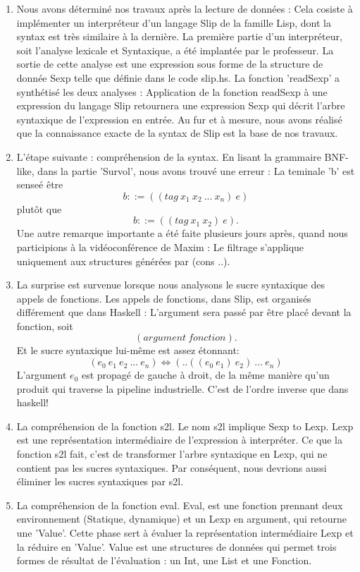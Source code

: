 \documentclass{article}
\begin{document}
\begin{enumerate}
\item 
Nous avons déterminé nos travaux après la lecture de données : Cela cosiste à
implémenter un interpréteur d'un langage Slip de la famille Lisp, dont la syntax
est très similaire à la dernière. La première partie d'un interpréteur, soit l'analyse
lexicale et Syntaxique, a été implantée par le professeur. La sortie de cette analyse 
est une expression sous forme de la structure de donnée Sexp telle que définie dans le code slip.hs.
La fonction 'readSexp' a synthétisé les deux analyses : Application de la fonction readSexp à
une expression du langage Slip retournera une expression Sexp qui décrit l'arbre syntaxique
de l'expression en entrée. Au fur et à mesure, nous avons réalisé que
la connaissance exacte de la syntax de Slip est la base de nos travaux.

\item L'étape suivante : compréhension de la syntax. En lisant la grammaire BNF-like, dans la 
partie 'Survol', nous avons trouvé une erreur : La teminale 'b' est senseé être 
$$b ::= ((tag\ x_1\ x_2\ ...\ x_n)\ e)$$ 
plutôt que 
$$b ::= ((tag\ x_1\ x_2)\ e).$$ 
Une autre remarque importante a été faite plusieurs jours après, quand nous participions à la
vidéoconférence de Maxim : Le filtrage s'applique uniquement aux structures générées par (cons ..).
\item 
La surprise est survenue lorsque nous analysons le sucre syntaxique des appels de fonctions.
Les appels de fonctions, dans Slip, est organisés différement que dans Haskell :
L'argument sera passé par être placé devant la fonction, soit $$(argument\ fonction).$$
Et le sucre syntaxique lui-même est assez étonnant:
$$(e_0\ e_1\ e_2\ ...\ e_n) \Longleftrightarrow (..((e_0\ e_1)\ e_2)\ ... \ e_n)$$
L'argument $e_0$ est propagé de gauche à droit, de la même manière qu'un produit qui traverse
la pipeline industrielle. C'est de l'ordre inverse que dans haskell!
\item La compréhension de la fonction s2l. Le nom s2l implique Sexp to Lexp. Lexp est
une représentation intermédiaire de l'expression à interpréter. Ce que la fonction s2l fait,
c'est de transformer l'arbre syntaxique en Lexp, qui ne contient pas les sucres syntaxiques. 
Par conséquent, nous devrions aussi éliminer les sucres syntaxiques par s2l.

\item La compréhension de la fonction eval. Eval, est une fonction prennant deux environnement
(Statique, dynamique) et un Lexp en argument, qui retourne une 'Value'. Cette phase sert à évaluer
la représentation intermédiaire Lexp et la réduire en 'Value'. Value est une structures de données qui
permet trois formes de résultat de l'évaluation : un Int, une List et une Fonction. 

\end{enumerate}
\end{document}
